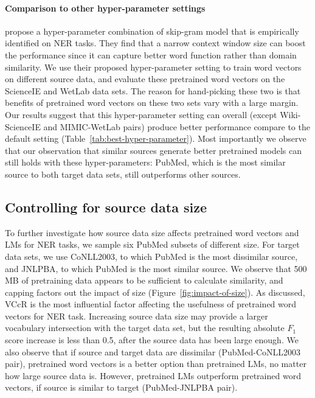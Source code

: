 \documentclass[11pt,a4paper]{article}
\begin{document}
\paragraph{Comparison to other hyper-parameter settings}
\citet{Chiu:Crichton:BioNLP:2016} propose a hyper-parameter combination of skip-gram model that is empirically identified on NER tasks. 
They find that a narrow context window size can boost the performance since it can capture better word function rather than domain similarity. 
We use their proposed hyper-parameter setting to train word vectors on different source data, and evaluate these pretrained word vectors on the ScienceIE and WetLab data sets. 
The reason for hand-picking these two is that benefits of pretrained word vectors on these two sets vary with a large margin. 
Our results suggest that this hyper-parameter setting can overall (except Wiki-ScienceIE and MIMIC-WetLab pairs) produce better performance compare to the default setting (Table~\ref{tab:best-hyper-parameter}). 
Most importantly we observe that our observation that similar sources generate better pretrained models can still holds with these hyper-parameters: PubMed, which is the most similar source to both target data sets, still outperforms other sources.

\subsection{Controlling for source data size\label{section:size}}
To further investigate how source data size affects pretrained word vectors and LMs for NER tasks, we sample six PubMed subsets of different size. 
For target data sets, we use CoNLL2003, to which PubMed is the most dissimilar source, and JNLPBA, to which PubMed is the most similar source. 
We observe that 500 MB of pretraining data appears to be sufficient to calculate similarity, and capping factors out the impact of size (Figure~\ref{fig:impact-of-size}). 
As discussed, VCcR is the most influential factor affecting the usefulness of pretrained word vectors for NER task. 
Increasing source data size may provide a larger vocabulary intersection with the target data set, but the resulting absolute $F_1$ score increase is less than 0.5, after the source data has been large enough. 
We also observe that if source and target data are dissimilar (PubMed-CoNLL2003 pair), pretrained word vectors is a better option than pretrained LMs, no matter how large source data is. 
However, pretrained LMs outperform pretrained word vectors, if source is similar to target (PubMed-JNLPBA pair). 
\end{document}
